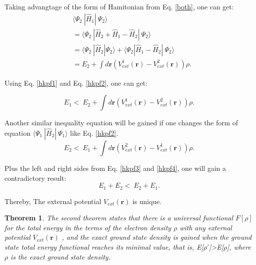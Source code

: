 \documentclass[a4paper, 12pt, titlepage,oneside,drop]{kthesis}
\newtheorem{thm}{Theorem}
\begin{document}
Taking advangtage of the form of Hamitonian from Eq. \ref{both}, one can get:
\begin{equation}\label{hkpf2}\begin{split}
&    \langle \Psi_2\ |\hat{H}_{1}|\ \Psi_2 \rangle \\
&  = \langle \Psi_2\ |\hat{H}_{2} + \hat{H}_{1} - \hat{H}_{2}|\ \Psi_2 \rangle \\
&  = \langle \Psi_2\ |\hat{H}_{2} |\Psi_2 \rangle + \langle \Psi_2 | \hat{H}_{1} - \hat{H}_{2}|\ \Psi_2 \rangle \\
&  = E_2 + \int d \textbf{r} ( V^{1}_\textit{ext}(\textbf{r}) - V^{2}_\textit{ext}(\textbf{r}) )  \rho.
\end{split}\end{equation}

Using Eq. \ref{hkpf1} and Eq. \ref{hkpf2}, one can get:

\begin{equation}\label{hkpf3}
 E_1  < \  E_2 + \int d \textbf{r} ( V^{1}_\textit{ext}(\textbf{r}) - V^{2}_\textit{ext}(\textbf{r}) )  \rho.
\end{equation}

Another similar inequality equation will be gained if one changes the form of equation $\langle \Psi_1\ |\hat{H}_{2}|\ \Psi_1 \rangle$ like Eq. \ref{hkpf2}.
\begin{equation}\label{hkpf4}
  E_2  < \  E_1 + \int d \textbf{r} ( V^{2}_\textit{ext}(\textbf{r}) - V^{1}_\textit{ext}(\textbf{r}) )  \rho.
\end{equation}

Plus the left and right sides from Eq. \ref{hkpf3} and \ref{hkpf4}, one will gain a contradictory result:
\begin{equation}\label{hkpf4}
  E_1 + E_2  < \  E_2 + E_1.
\end{equation}

Thereby, The external potential $V_\textit{ext}(\textbf{r})$ is unique.

\begin{thm}
\label{hk2}
\noindent The second theorem states that there is a universal functional $F[\rho]$ for the total energy in the terms of the electron density $\rho$ with any external potential $V_\textit{ext}(\textbf{r})$ ,
and the exact ground state density is gained when the ground state total energy functional reaches its minimal value, that is, E[$\rho'$]>E[$\rho$], where $\rho$ is the exact ground state density.
\end{thm}
\end{document}
